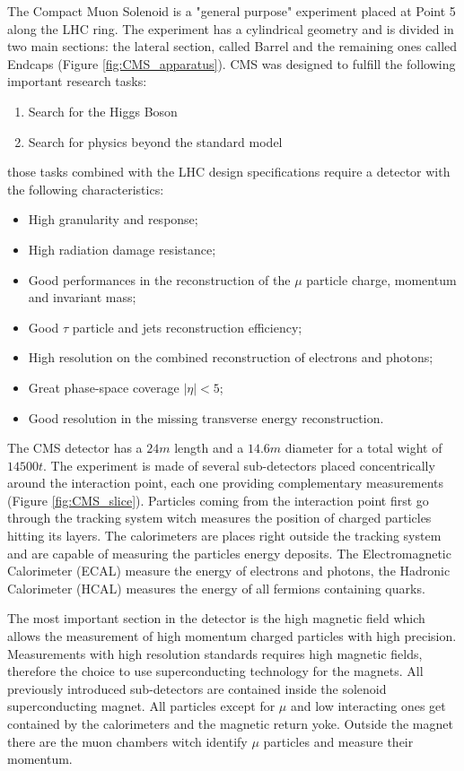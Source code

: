 The Compact Muon Solenoid is a "general purpose" experiment placed at Point 5 along the LHC ring. The experiment has a cylindrical geometry and is divided in two main sections: the lateral section, called Barrel and the remaining ones called Endcaps (Figure \ref{fig:CMS_apparatus}).   
CMS was designed to fulfill the following important research tasks:
\begin{enumerate}
	\item Search for the Higgs Boson
	\item Search for physics beyond the standard model
\end{enumerate}
those tasks combined with the LHC design specifications require a detector with the following characteristics:
\begin{itemize}
	\item High granularity and response;
	\item High radiation damage resistance;
	\item Good performances in the reconstruction of the $\mu$ particle charge, momentum and invariant mass;
	\item Good $\tau$ particle and jets reconstruction efficiency;
	\item High resolution on the combined reconstruction of electrons and photons;
	\item Great phase-space coverage $|\eta| < 5$;
	\item Good resolution in the missing transverse energy reconstruction.
\end{itemize} 

The CMS detector has a $24 m$ length and a $14.6 m$ diameter for a total wight of $14500 t$. The experiment is made of several sub-detectors placed concentrically around the interaction point, each one providing complementary measurements (Figure \ref{fig:CMS_slice}). Particles coming from the interaction point first go through the tracking system witch measures the position of charged particles hitting its layers. The calorimeters are places right outside the tracking system and are capable of measuring the particles energy deposits. The Electromagnetic Calorimeter (ECAL) measure the energy of electrons and photons, the Hadronic Calorimeter (HCAL) measures the energy of all fermions containing quarks.

The most important section in the detector is the high magnetic field which allows the measurement of high momentum charged particles with high precision. Measurements with high resolution standards requires high magnetic fields, therefore the choice to use superconducting technology for the magnets. All previously introduced sub-detectors are contained inside the solenoid superconducting magnet. All particles except for $\mu$ and low interacting ones get contained by the calorimeters and the magnetic return yoke. Outside the magnet there are the muon chambers witch identify $\mu$ particles and measure their momentum.

